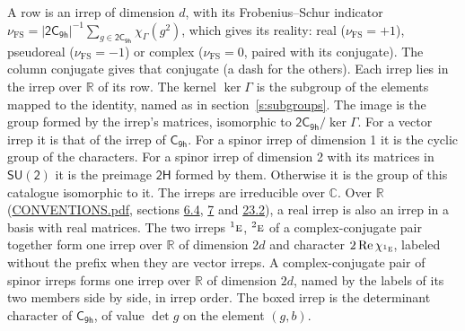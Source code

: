 \documentclass[10pt,a4paper]{article}
\numberwithin{equation}{section}
\newcommand{\grp}[1]{\mathsf{#1}}
\newcommand{\irr}[1]{\text{\normalfont\scshape #1}}
\newcommand{\conjpair}[1]{{}^{#1}}
\newcommand{\irchar}[1]{\chi_{#1}}
\newcommand{\fsind}{\nu_{\mathrm{FS}}}
\begin{document}
\leavevmode\label{n:index.frobenius}\label{n:head.irrep}\label{n:head.reality}A row is an irrep of dimension $d$, with its Frobenius--Schur indicator $\fsind = |\grp{2C_{9h}}|^{-1}\allowbreak\sum_{g\in\grp{2C_{9h}}}\irchar{\Gamma}(g^2)$, which gives its reality: real ($\fsind = +1$), pseudoreal ($\fsind = -1$) or complex ($\fsind = 0$, paired with its conjugate). \label{n:head.conjugate}The column conjugate gives that conjugate (a dash for the others). \label{n:head.over.real}Each irrep lies in the irrep over $\mathbb{R}$ of its row. \label{n:head.kernel}The kernel $\ker\Gamma$ is the subgroup of the elements mapped to the identity, named as in section~\ref{s:subgroups}. \label{n:head.image}The image is the group formed by the irrep's matrices, isomorphic to $\grp{2C_{9h}}/\ker\Gamma$. For a vector irrep it is that of the irrep of \href{../../../rotation/data/pdf/C9h.pdf}{$\grp{C_{9h}}$}. For a spinor irrep of dimension 1 it is the cyclic group of the characters. For a spinor irrep of dimension 2 with its matrices in $\grp{SU(2)}$ it is the preimage $\grp{2H}$ formed by them. Otherwise it is the group of this catalogue isomorphic to it. The irreps are irreducible over $\mathbb{C}$. Over $\mathbb{R}$ (\href{../../CONVENTIONS.pdf}{CONVENTIONS.pdf}, sections \href{../../../rotation/CONVENTIONS.pdf\#conv.6.4}{6.4}, \href{../../../rotation/CONVENTIONS.pdf\#conv.7}{7} and \href{../../CONVENTIONS.pdf\#conv.23.2}{23.2}), a real irrep is also an irrep in a basis with real matrices. The two irreps $\conjpair{1}\irr{e}$, $\conjpair{2}\irr{e}$ of a complex-conjugate pair together form one irrep over $\mathbb{R}$ of dimension $2d$ and character $2\operatorname{Re}\irchar{\conjpair{1}\irr{e}}$, labeled without the prefix when they are vector irreps. A complex-conjugate pair of spinor irreps forms one irrep over $\mathbb{R}$ of dimension $2d$, named by the labels of its two members side by side, in irrep order. \label{n:mark.determinant}The boxed irrep is the determinant character of \href{../../../rotation/data/pdf/C9h.pdf}{$\grp{C_{9h}}$}, of value $\det g$ on the element $(g, b)$.
\setlength{\emergencystretch}{2em}\par\setlength{\emergencystretch}{0pt}
\end{document}
